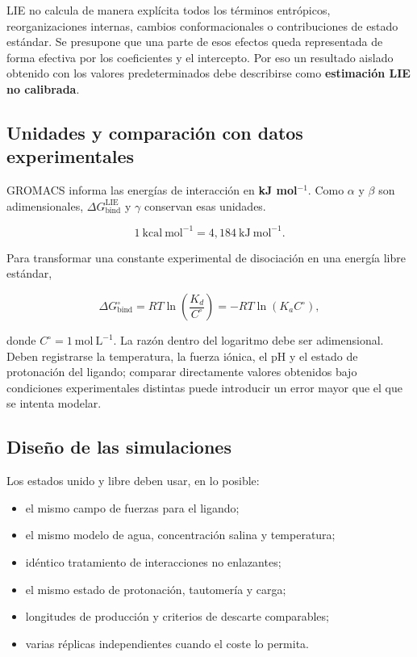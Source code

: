 \documentclass[
  spanish,
  11pt,
  a4paper]{article}
\providecommand{\tightlist}{%
  \setlength{\itemsep}{0pt}\setlength{\parskip}{0pt}}
\begin{document}
LIE no calcula de manera explícita todos los términos entrópicos,
reorganizaciones internas, cambios conformacionales o contribuciones de
estado estándar. Se presupone que una parte de esos efectos queda
representada de forma efectiva por los coeficientes y el intercepto. Por
eso un resultado aislado obtenido con los valores predeterminados debe
describirse como \textbf{estimación LIE no calibrada}.

\subsection{Unidades y comparación con datos
experimentales}\label{unidades-y-comparaciuxf3n-con-datos-experimentales}

GROMACS informa las energías de interacción en \textbf{kJ mol\(^{-1}\)}.
Como \(\alpha\) y \(\beta\) son adimensionales,
\(\Delta G_{\mathrm{bind}}^{\mathrm{LIE}}\) y \(\gamma\) conservan esas
unidades.

\[
1\ \mathrm{kcal\ mol^{-1}}=4{,}184\ \mathrm{kJ\ mol^{-1}}.
\]

Para transformar una constante experimental de disociación en una
energía libre estándar,

\[
\Delta G^\circ_{\mathrm{bind}}
=
RT\ln\left(\frac{K_d}{C^\circ}\right)
=
-RT\ln\left(K_a C^\circ\right),
\]

donde \(C^\circ=1\ \mathrm{mol\ L^{-1}}\). La razón dentro del logaritmo
debe ser adimensional. Deben registrarse la temperatura, la fuerza
iónica, el pH y el estado de protonación del ligando; comparar
directamente valores obtenidos bajo condiciones experimentales distintas
puede introducir un error mayor que el que se intenta modelar.

\subsection{Diseño de las
simulaciones}\label{diseuxf1o-de-las-simulaciones}

Los estados unido y libre deben usar, en lo posible:

\begin{itemize}
\tightlist
\item
  el mismo campo de fuerzas para el ligando;
\item
  el mismo modelo de agua, concentración salina y temperatura;
\item
  idéntico tratamiento de interacciones no enlazantes;
\item
  el mismo estado de protonación, tautomería y carga;
\item
  longitudes de producción y criterios de descarte comparables;
\item
  varias réplicas independientes cuando el coste lo permita.
\end{itemize}
\end{document}
